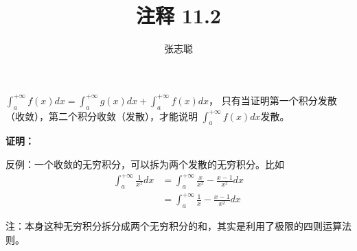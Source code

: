 \documentclass{article}
\begin{document}
\title{注释 11.2}
\author{张志聪}
\maketitle

\begin{zremark}
  $\int_{a}^{+\infty} f(x) dx = \int_{a}^{+\infty} g(x) dx + \int_{a}^{+\infty} f(x) dx$，
  只有当证明第一个积分发散（收敛），第二个积分收敛（发散），才能说明
  $\int_{a}^{+\infty} f(x) dx$发散。
\end{zremark}

\textbf{证明：}

反例：一个收敛的无穷积分，可以拆为两个发散的无穷积分。比如
\begin{align*}
  \int_{a}^{+\infty} \frac{1}{x^2} dx
   & = \int_{a}^{+\infty} \frac{x}{x^2} - \frac{x - 1}{x^2} dx \\
   & = \int_{a}^{+\infty} \frac{1}{x} - \frac{x - 1}{x^2} dx
\end{align*}

注：本身这种无穷积分拆分成两个无穷积分的和，其实是利用了极限的四则运算法则。
\end{document}
